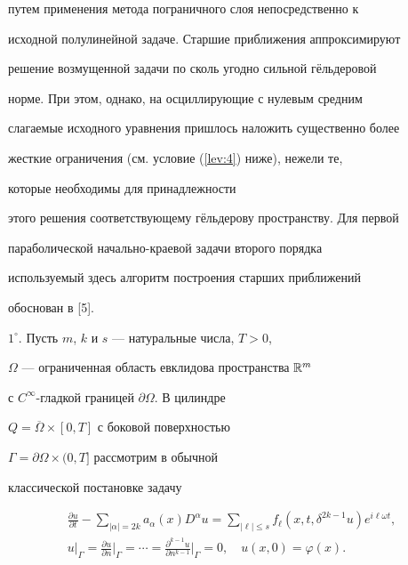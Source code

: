 путем применения метода пограничного слоя непосредственно к


исходной полулинейной задаче. Старшие приближения аппроксимируют


решение возмущенной задачи по сколь угодно сильной г\"ельдеровой


норме. При этом, однако, на осциллирующие с нулевым средним


слагаемые исходного уравнения пришлось наложить существенно более


жесткие ограничения (см. условие (\ref{lev:4}) ниже), нежели те,


которые необходимы для принадлежности


этого решения соответствующему г\"ельдерову пространству. Для первой


параболической начально-краевой задачи второго порядка


используемый здесь алгоритм построения старших приближений


обоснован в [5].


\medskip





$1^\circ$. Пусть $m$, $k$ и $s$ --- натуральные числа, $T>0$,


$\Omega$ --- ограниченная область евклидова пространства $\Bbb R^m$


с $C^\infty$-гладкой границей $\partial \Omega$. В цилиндре


$Q=\overline{\Omega}\times[0,T]$ с боковой поверхностью


$\Gamma=\partial\Omega\times(0,T]$ рассмотрим в обычной


классической постановке задачу


\begin{gather}\label{lev:1}


\frac{\partial u}{\partial t}-\sum_{|\alpha|=2k}


a_\alpha(x)D^\alpha u=\sum_{|\ell|\leqslant s} f_\ell(x,t,\delta^{2k-1}u)


e^{i\ell\omega t},\\


%


\label{lev:2}


u\big|_\Gamma=\frac{\partial u}{\partial


n}\Big|_\Gamma=\dotsb=\frac{\partial^{k-1} u}{\partial


n^{k-1}}\Big|_\Gamma=0,\quad


u(x,0)=\varphi(x).


\end{gather}


